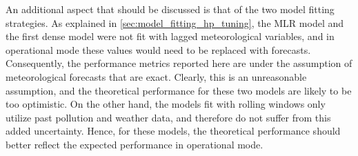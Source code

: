 An additional aspect that should be discussed is that of the two model fitting strategies. As explained in \cref{sec:model_fitting_hp_tuning}, the MLR model and the first dense model were not fit with lagged meteorological variables, and in operational mode these values would need to be replaced with forecasts. Consequently, the performance metrics reported here are under the assumption of meteorological forecasts that are exact. Clearly, this is an unreasonable assumption, and the theoretical performance for these two models are likely to be too optimistic. On the other hand, the models fit with rolling windows only utilize past pollution and weather data, and therefore do not suffer from this added uncertainty. Hence, for these models, the theoretical performance should better reflect the expected performance in operational mode. 



%








%
%
%

